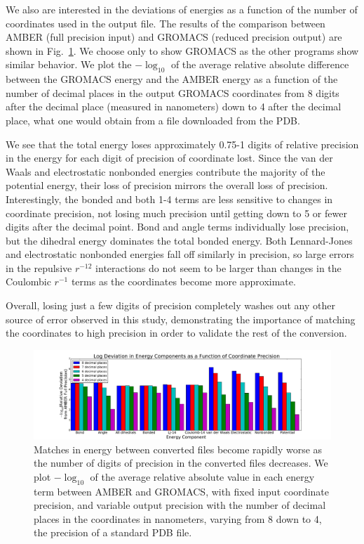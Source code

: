 We also are interested in the deviations of energies as a function of
the number of coordinates used in the output file. The results of the
comparison between AMBER (full precision input) and GROMACS (reduced
precision output) are shown in Fig.~\ref{fig:precision}.  We choose
only to show GROMACS as the other programs show similar behavior. We
plot the $-\log_{10}$ of the average relative absolute difference
between the GROMACS energy and the AMBER energy as a function of the
number of decimal places in the output GROMACS coordinates from 8
digits after the decimal place (measured in nanometers) down to 4
after the decimal place, what one would obtain from a file downloaded
from the PDB.  

We see that the total energy loses approximately 0.75-1 digits of
relative precision in the energy for each digit of precision of
coordinate lost. Since the van der Waals and electrostatic nonbonded
energies contribute the majority of the potential energy, their loss
of precision mirrors the overall loss of precision. Interestingly, the
bonded and both 1-4 terms are less sensitive to changes in coordinate
precision, not losing much precision until getting down to 5 or fewer
digits after the decimal point. Bond and angle terms individually lose
precision, but the dihedral energy dominates the total bonded energy.
Both Lennard-Jones and electrostatic nonbonded energies fall off
similarly in precision, so large errors in the repulsive $r^{-12}$
interactions do not seem to be larger than changes in the Coulombic
$r^{-1}$ terms as the coordinates become more approximate.

Overall, losing just a few digits of precision completely washes out
any other source of error observed in this study, demonstrating the
importance of matching the coordinates to high precision in order to
validate the rest of the conversion.

\begin{figure}[h]
\includegraphics[width=\textwidth]{precisioncomparison.pdf}   
\caption{Matches in energy between converted files become rapidly
  worse as the number of digits of precision in the converted files
  decreases. We plot $-\log_{10}$ of the average relative absolute
  value in each energy term between AMBER and GROMACS, with fixed
  input coordinate precision, and variable output precision with the
  number of decimal places in the coordinates in nanometers, varying
  from 8 down to 4, the precision of a standard PDB file.
\label{fig:precision}}
\end{figure}

